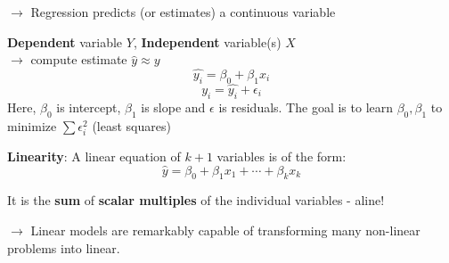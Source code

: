 \documentclass[letterpaper, 10.5pt,landscape]{article}
\makeatletter
\renewcommand{\subsubsection}{\@startsection{subsubsection}{3}{0mm}%
                                {-1ex plus -.5ex minus -.2ex}%
                                {1ex plus .2ex}%
                                {\normalfont\small\bfseries}}
\makeatother
\begin{document}
\begin{multicols*}{3}
$\rightarrow$ Regression predicts (or estimates) a continuous variable 

\vspace{2pt}


\textbf{Dependent} variable $Y$, \textbf{Independent} variable(s) $X$ \\
$\rightarrow$ compute estimate $\hat{y} \approx y$
\vspace{-5pt}
\[\hat{y_{i}} = \beta_{0} + \beta_{1}x_{i} \]
\vspace{-10pt}
\[ y_{i} = \hat{y_{i}} +  \epsilon_{i} \]
Here, $\beta_{0}$ is intercept, $\beta_{1}$ is slope and $\epsilon$ is residuals. The goal is to learn $\beta_{0}, \beta_{1}$ to minimize $\sum \epsilon^{2}_{i}$ (least squares)









\vspace{5pt}
\textbf{Linearity}: A linear equation of $k+1$ variables is of the form:
\[\hat{y} = \beta_{0} + \beta_{1}x_{1} + \cdots + \beta_{k}x_{k} \]

It is the \textbf{sum} of \textbf{scalar multiples} of the individual variables - aline!




\vspace{3pt}


$\rightarrow$ Linear models are remarkably capable of transforming many non-linear problems into linear.







\end{multicols*}
\end{document}

